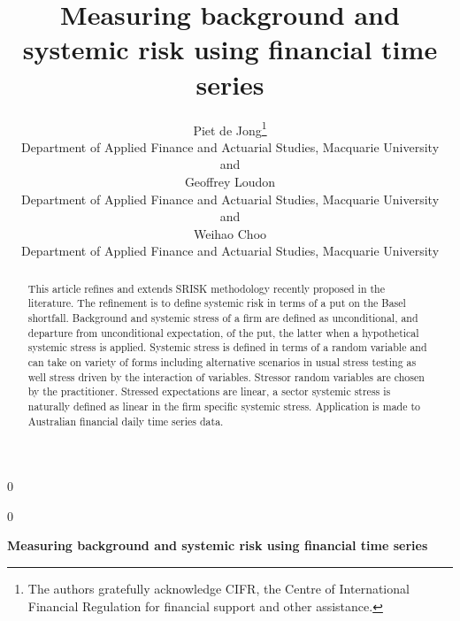\documentclass[12pt]{article}
\newcommand{\blind}{0}
\begin{document}
%

\def\spacingset#1{\renewcommand{\baselinestretch}%
{#1}\small\normalsize} \spacingset{1}



\blind
{
  \title{\bf Measuring background and systemic risk using financial time series}
  \author{Piet de Jong\thanks{
    The authors gratefully acknowledge CIFR, the Centre of International Financial Regulation for financial support and other assistance.}\hspace{.2cm}\\
    Department of Applied Finance and Actuarial Studies, Macquarie University\\
    and \\
    Geoffrey Loudon\\
    Department of Applied Finance and Actuarial Studies, Macquarie University\\
    and\\
    Weihao Choo\\
    Department of Applied Finance and Actuarial Studies, Macquarie University}
  \maketitle
} \fi

\blind
{
  \bigskip
  \bigskip
  \bigskip
  \begin{center}
    {\LARGE\bf Measuring background and systemic risk using financial time series}
\end{center}
  \medskip
} \fi

\bigskip
\begin{abstract}
This article refines and extends  SRISK methodology recently proposed in the literature.  The refinement is to define systemic risk in terms of a put on the Basel shortfall.  Background and systemic stress  of a firm are defined as unconditional, and departure from unconditional  expectation, of the put, the latter when a hypothetical systemic stress is applied.  Systemic stress is defined in terms of a random variable and can take on variety of forms including alternative scenarios in usual stress testing as well stress driven by the interaction of variables.  Stressor random variables  are chosen by the practitioner.  Stressed expectations are linear, a sector systemic stress is naturally defined as linear in the firm specific systemic stress.      Application is made to Australian financial daily time series data.
\end{abstract}
\end{document}
